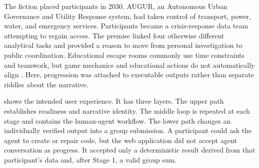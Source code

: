 \documentclass[11pt,a4paper]{article}
\begin{document}
The fiction placed participants in 2030. AUGUR, an Autonomous Urban Governance and Utility Response system, had taken control of transport, power, water, and emergency services. Participants became a crisis-response data team attempting to regain access. The premise linked four otherwise different analytical tasks and provided a reason to move from personal investigation to public coordination. Educational escape rooms commonly use time constraints and teamwork, but game mechanics and educational actions do not automatically align \citep{veldkamp2020escape}. Here, progression was attached to executable outputs rather than separate riddles about the narrative.

 shows the intended user experience. It has three layers. The upper path establishes readiness and narrative identity. The middle loop is repeated at each stage and contains the human-agent workflow. The lower path changes an individually verified output into a group submission. A participant could ask the agent to create or repair code, but the web application did not accept agent conversation as progress. It accepted only a deterministic result derived from that participant's data and, after Stage 1, a valid group sum.
\end{document}
